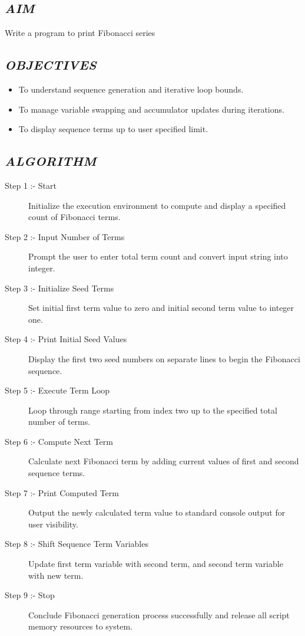 \documentclass[11pt,a4paper]{article}
\begin{document}
\subsection*{\textit{AIM}}
Write a program to print Fibonacci series

\subsection*{\textit{OBJECTIVES}}
\begin{itemize}
  \item To understand sequence generation and iterative loop bounds.
  \item To manage variable swapping and accumulator updates during iterations.
  \item To display sequence terms up to user specified limit.
\end{itemize}

\subsection*{\textit{ALGORITHM}}
\begin{description}
  \item[Step 1 :- Start] Initialize the execution environment to compute and display a specified count of Fibonacci terms.
  \item[Step 2 :- Input Number of Terms] Prompt the user to enter total term count and convert input string into integer.
  \item[Step 3 :- Initialize Seed Terms] Set initial first term value to zero and initial second term value to integer one.
  \item[Step 4 :- Print Initial Seed Values] Display the first two seed numbers on separate lines to begin the Fibonacci sequence.
  \item[Step 5 :- Execute Term Loop] Loop through range starting from index two up to the specified total number of terms.
  \item[Step 6 :- Compute Next Term] Calculate next Fibonacci term by adding current values of first and second sequence terms.
  \item[Step 7 :- Print Computed Term] Output the newly calculated term value to standard console output for user visibility.
  \item[Step 8 :- Shift Sequence Term Variables] Update first term variable with second term, and second term variable with new term.
  \item[Step 9 :- Stop] Conclude Fibonacci generation process successfully and release all script memory resources to system.
\end{description}
\end{document}
